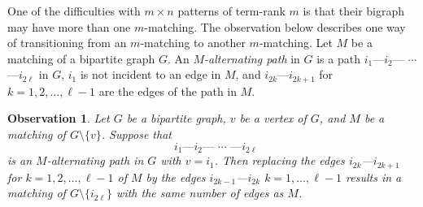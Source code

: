 \documentclass[preprint,12pt]{elsarticle}
\newtheorem{observation}[theorem]{Observation}
\begin{document}
One of the difficulties with $m\times n$ patterns of term-rank $m$ is that their bigraph
may have more than one $m$-matching.  The observation below describes one way of transitioning from an $m$-matching to 
another $m$-matching. Let $M$ be a matching of a bipartite graph $G$. An \textit{$M$-alternating path}
in $G$ is a path $i_1$---$i_2$--- $\cdots$ ---$i_{2\ell}$ in $G$, 
$i_1$ is not incident to an edge in $M$,  and  $i_{2k}$---$i_{2k+1}$ 
for $k=1,2,\ldots, \ell-1$ are the edges of the path  in $M$.

\begin{observation}
\label{alternating}
Let $G$ be a bipartite graph, $v$ be a vertex of $G$, and  $M$ be a matching of $G\setminus \{v\}$.
Suppose that 
\[ 
\mbox{ $i_1$---$i_2$--- $\cdots$ ---$i_{2\ell}$}
\]
is an $M$-alternating path in $G$ with $v=i_1$.
Then replacing the edges $i_{2k}$---$i_{2k+1}$ 
for $k=1,2,\ldots, \ell-1$ of $M$ by the edges 
$i_{2k-1}$---$i_{2k}$ $k=1,\ldots, \ell-1$
results in a matching of $G\setminus \{i_{2\ell}\}$ with the same number of edges as $M$. 
\end{observation}
\end{document}

